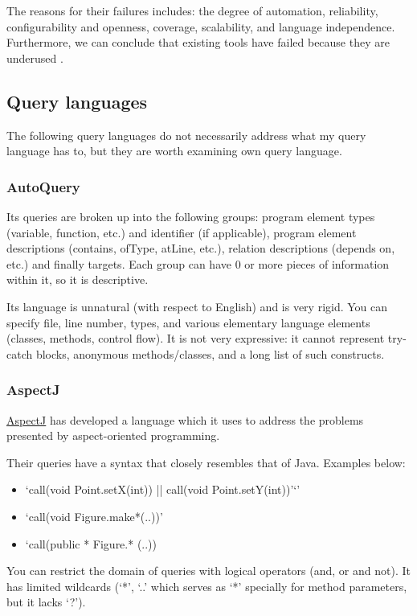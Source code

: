 \documentclass[12pt, letterpaper]{article}
\begin{document}
The reasons for their failures includes: the degree of automation, reliability, configurability and openness, coverage, scalability, and language independence. \autocite{mens2004survey} Furthermore, we can conclude that existing tools have failed because they are underused \autocite{murphy2012we}.

\subsection{Query languages}
The following query languages do not necessarily address what my query language has to, but they are worth examining own query language.

\subsubsection{AutoQuery}
\label{sec:AutoQuery}
Its queries are broken up into the following groups: program element types (variable, function, etc.) and identifier (if applicable), program element descriptions (contains, ofType, atLine, etc.), relation descriptions (depends on, etc.) and finally targets.
Each group can have 0 or more pieces of information within it, so it is descriptive.

Its language is unnatural (with respect to English) and is very rigid.
You can specify file, line number, types, and various elementary language elements (classes, methods, control flow).
It is not very expressive: it cannot represent try-catch blocks, anonymous methods/classes, and a long list of such constructs.

\subsubsection{AspectJ}
\href{https://eclipse.org/aspectj/doc/next/progguide/starting-aspectj.html}{AspectJ} has developed a language which it uses to address the problems presented by aspect-oriented programming.  

Their queries have a syntax that closely resembles that of Java. Examples below:
\begin{itemize}
  \item `call(void Point.setX(int)) || call(void Point.setY(int))'`'
  \item `call(void Figure.make*(..))'
  \item `call(public * Figure.* (..))
\end{itemize}

You can restrict the domain of queries with logical operators (and, or and not).
It has limited wildcards (`*', `..' which serves as `*' specially for method parameters, but it lacks `?').
\end{document}
